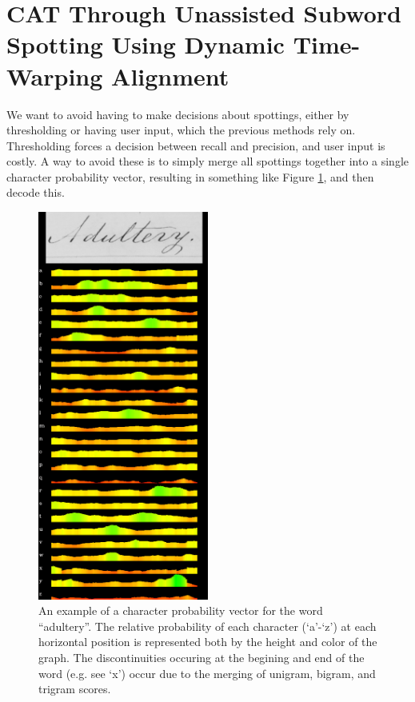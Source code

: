 \documentclass[ms,electronic,twosidetoc,letterpaper,chaptercenter,parttop,lof,lot]{byumsphd}
\begin{document}

\section{CAT Through Unassisted Subword Spotting Using Dynamic Time-Warping Alignment} %

We want to avoid having to make decisions about spottings, either by thresholding or having user input, which the previous methods rely on. Thresholding forces a decision between recall and precision, and user input is costly. A way to avoid these is to simply merge all spottings together into a single character probability vector, resulting in something like Figure \ref{fig:cpv}, and then decode this.

\begin{figure}
    \centering
    \includegraphics[width=0.5\textwidth]{cpv}
    \caption{An example of a character probability vector for the word ``adultery''. The relative probability of each character (`a'-`z') at each horizontal position is represented both by the height and color of the graph. The discontinuities occuring at the begining and end of the word (e.g. see `x') occur due to the merging of unigram, bigram, and trigram scores.}
    \label{fig:cpv}
\end{figure}
\end{document}
